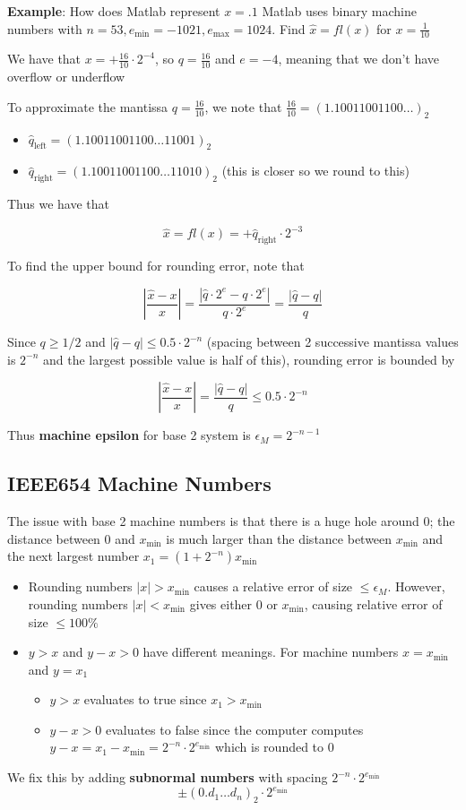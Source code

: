 \documentclass{article}
\begin{document}
\textbf{Example}: How does Matlab represent $x = .1$ Matlab uses binary machine numbers with $n = 53, e_{\min} = -1021, e_{\max} = 1024$. Find $\hat{x} = fl(x)$ for $x = \frac{1}{10}$

We have that $x = + \frac{16}{10} \cdot 2^{-4}$, so $q = \frac{16}{10}$ and $e = -4$, meaning that we don't have overflow or underflow

To approximate the mantissa $q = \frac{16}{10}$, we note that $\frac{16}{10} = (1.10011001100 \ldots)_2$
\begin{itemize}
  \item $\hat{q}_\text{left} = (1.10011001100 \ldots 11001)_2$
  \item $\hat{q}_\text{right} = (1.10011001100 \ldots 11010)_2$ (this is closer so we round to this)
\end{itemize}

Thus we have that

\[\hat{x} = fl(x) = + \hat{q}_\text{right} \cdot 2^{-3}\]

To find the upper bound for rounding error, note that

\[\left| \frac{\hat{x} - x}{x} \right| = \frac{|\hat{q} \cdot 2^e - q \cdot 2^e|}{q \cdot 2^e} = \frac{|\hat{q} - q|}{q}\]

Since $q \geq 1/2$ and $|\hat{q} - q| \leq 0.5 \cdot 2^{-n}$ (spacing between 2 successive mantissa values is $2^{-n}$ and the largest possible value is half of this), rounding error is bounded by

\[\left| \frac{\hat{x} - x}{x} \right| = \frac{|\hat{q} - q|}{q} \leq 0.5 \cdot 2^{-n}\]

Thus \textbf{machine epsilon} for base 2 system is $\epsilon_M = 2^{-n-1}$
\subsection{IEEE654 Machine Numbers}

The issue with base 2 machine numbers is that there is a huge hole around $0$; the distance between $0$ and $x_{\min}$ is much larger than the distance between $x_{\min}$ and the next largest number $x_1 = (1 + 2^{-n})x_{\min}$
\begin{itemize}
  \item Rounding numbers $|x| > x_{\min}$ causes  a relative error of size $\leq \epsilon_M$. However, rounding numbers $|x| < x_{\min}$ gives either $0$ or $x_{\min}$, causing relative error of size $\leq 100 \%$
  \item $y > x$ and $y - x > 0$ have different meanings. For machine numbers $x = x_{\min}$ and $y = x_1$
    \begin{itemize}
      \item $y > x$ evaluates to true since $x_1 > x_{\min}$
      \item $y - x > 0$ evaluates to false since the computer computes $y - x = x_1 - x_{\min} = 2^{-n} \cdot 2^{e_{\min}}$ which is rounded to $0$
    \end{itemize}
\end{itemize}
We fix this by adding \textbf{subnormal numbers} with spacing $2^{-n}\cdot 2^{e_{\min}}$
\[ \pm(0.d_1 \ldots d_n)_2 \cdot 2^{e_{\min}}\]
\end{document}
